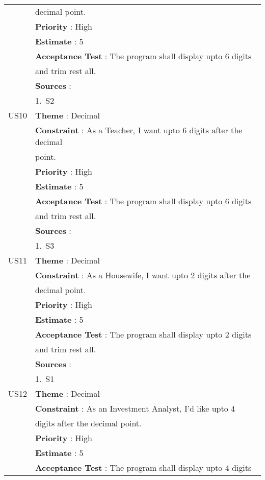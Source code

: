 \documentclass{article}
\begin{document}
\begin{longtable}{|| c || l ||}
         & decimal point. \\ 
         & \textbf{Priority} : High \\
         & \textbf{Estimate} : 5 \\
         & \textbf{Acceptance Test} : The program shall display upto 6 digits \\ 
         & and trim rest all. \\
         & \textbf{Sources} : \\
         & 1.~S2 \\
         \hline
         US10 & \textbf{Theme} : Decimal \\
         & \textbf{Constraint} : As a Teacher, I want upto 6 digits after the decimal \\
         & point. \\ 
         & \textbf{Priority} : High \\
         & \textbf{Estimate} : 5 \\
         & \textbf{Acceptance Test} : The program shall display upto 6 digits \\ 
         & and trim rest all. \\
         & \textbf{Sources} : \\
         & 1.~S3 \\
         \hline
         US11 & \textbf{Theme} : Decimal \\
         & \textbf{Constraint} : As a Housewife, I want upto 2 digits after the\\ 
         & decimal point. \\ 
         & \textbf{Priority} : High \\
         & \textbf{Estimate} : 5 \\
         & \textbf{Acceptance Test} : The program shall display upto 2 digits \\ 
         & and trim rest all. \\
         & \textbf{Sources} : \\
         & 1.~S1 \\
         \hline
         US12 & \textbf{Theme} : Decimal \\
         & \textbf{Constraint} : As an Investment Analyst, I'd like upto 4 \\ 
         & digits after the decimal point. \\
         & \textbf{Priority} : High \\
         & \textbf{Estimate} : 5 \\
         & \textbf{Acceptance Test} : The program shall display upto 4 digits \\ 

\end{longtable}
\end{document}

